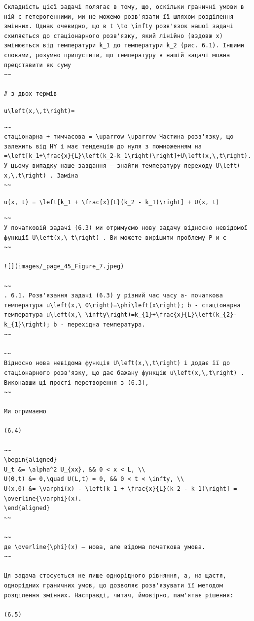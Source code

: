 \documentclass[
  ukrainian,
]{article}
\begin{document}
\begin{verbatim}
Складність цієї задачі полягає в тому, що, оскільки граничні умови в ній є гетерогенними, ми не можемо розв'язати її шляхом розділення змінних. Однак очевидно, що в t \to \infty розв'язок нашої задачі схиляється до стаціонарного розв'язку, який лінійно (вздовж x) змінюється від температури k_1 до температури k_2 (рис. 6.1). Іншими словами, розумно припустити, що температуру в нашій задачі можна представити як суму
~~

# з двох термів
\end{verbatim}

\texttt{u\textbackslash{}left(x,\textbackslash{},t\textbackslash{}right)=}

\begin{verbatim}
~~
стаціонарна + тимчасова = \uparrow \uparrow Частина розв'язку, що залежить від HY і має тенденцію до нуля з помноженням на =\left[k_1+\frac{x}{L}\left(k_2-k_1\right)\right]+U\left(x,\,t\right). У цьому випадку наше завдання — знайти температуру переходу U\left( x,\,t\right) . Заміна
~~
\end{verbatim}

\texttt{u(x,\ t)\ =\ \textbackslash{}left{[}k\_1\ +\ \textbackslash{}frac\{x\}\{L\}(k\_2\ -\ k\_1)\textbackslash{}right{]}\ +\ U(x,\ t)}

\begin{verbatim}
~~
У початковій задачі (6.3) ми отримуємо нову задачу відносно невідомої функції U\left(x,\ t\right) . Ви можете вирішити проблему Р и с
~~

![](images/_page_45_Figure_7.jpeg)

~~
. 6.1. Розв'язання задачі (6.3) у різний час часу a- початкова температура u\left(x,\ 0\right)=\phi\left(x\right); b - стаціонарна температура u\left(x,\ \infty\right)=k_{1}+\frac{x}{L}\left(k_{2}-k_{1}\right); b - перехідна температура.
~~

~~
Відносно нова невідома функція U\left(x,\,t\right) і додає її до стаціонарного розв'язку, що дає бажану функцію u\left(x,\,t\right) . Виконавши ці прості перетворення з (6.3),
~~

Ми отримаємо

(6.4)

~~
\begin{aligned}
U_t &= \alpha^2 U_{xx}, && 0 < x < L, \\
U(0,t) &= 0,\quad U(L,t) = 0, && 0 < t < \infty, \\
U(x,0) &= \varphi(x) - \left[k_1 + \frac{x}{L}(k_2 - k_1)\right] = \overline{\varphi}(x).
\end{aligned}
~~

~~
де \overline{\phi}(x) — нова, але відома початкова умова.
~~

Ця задача стосується не лише однорідного рівняння, а, на щастя, однорідних граничних умов, що дозволяє розв'язувати її методом розділення змінних. Насправді, читач, ймовірно, пам'ятає рішення:

(6.5)
\end{verbatim}
\end{document}
